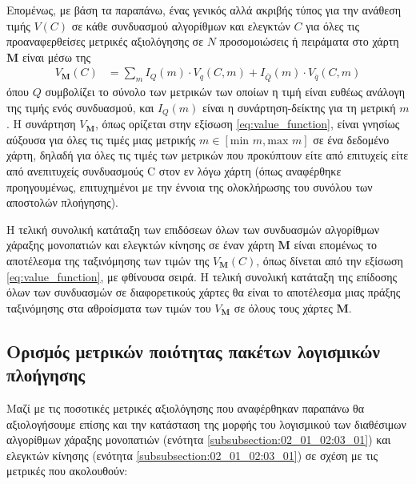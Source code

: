 Επομένως, με βάση τα παραπάνω, ένας γενικός αλλά ακριβής τύπος για την ανάθεση
τιμής $V(C)$ σε κάθε συνδυασμού αλγορίθμων και ελεγκτών $C$ για όλες τις
προαναφερθείσες μετρικές αξιολόγησης σε $N$ προσομοιώσεις ή πειράματα στο χάρτη
$\bm{M}$ είναι μέσω της
\begin{align}
  \label{eq:value_function}
  V_{\bm{M}}(C) &= \sum\limits_{m} I_Q(m) \cdot V_q(C,m) + I_{\overline{Q}}(m) \cdot V_{\overline{q}}(C,m)
\end{align}
όπου $Q$ συμβολίζει το σύνολο των μετρικών των οποίων η τιμή είναι ευθέως
ανάλογη της τιμής ενός συνδυασμού, και $I_Q(m)$ είναι η συνάρτηση-δείκτης για
τη μετρική $m$.  H συνάρτηση $V_{\bm{M}}$, όπως ορίζεται στην εξίσωση
\ref{eq:value_function}, είναι γνησίως αύξουσα για όλες τις τιμές μιας μετρικής
$m \in [\text{min } m, \text{max } m]$ σε ένα δεδομένο χάρτη, δηλαδή για όλες
τις τιμές των μετρικών που προκύπτουν είτε από επιτυχείς είτε από ανεπιτυχείς
συνδυασμούς C στον εν λόγω χάρτη (όπως αναφέρθηκε προηγουμένως, επιτυχημένοι
με την έννοια της ολοκλήρωσης του συνόλου των αποστολών πλοήγησης).

Η τελική συνολική κατάταξη των επιδόσεων όλων των συνδυασμών αλγορίθμων
χάραξης μονοπατιών και ελεγκτών κίνησης σε έναν χάρτη $\bm{M}$ είναι
επομένως το αποτέλεσμα της ταξινόμησης των τιμών της $V_{\bm{M}}(C)$, όπως
δίνεται από την εξίσωση \ref{eq:value_function}, με φθίνουσα σειρά. Η τελική
συνολική κατάταξη της επίδοσης όλων των συνδυασμών σε διαφορετικούς χάρτες θα
είναι το αποτέλεσμα μιας πράξης ταξινόμησης στα αθροίσματα των τιμών του
$V_{\bm{M}}$ σε όλους τους χάρτες $\bm{M}$.


\subsection{Ορισμός μετρικών ποιότητας πακέτων λογισμικών πλοήγησης}
\label{subsection:02_01_03:04}

Μαζί με τις ποσοτικές μετρικές αξιολόγησης που αναφέρθηκαν παραπάνω θα
αξιολογήσουμε επίσης και την κατάσταση της μορφής του λογισμικού των διαθέσιμων
αλγορίθμων χάραξης μονοπατιών (ενότητα \ref{subsubsection:02_01_02:03_01})
και ελεγκτών κίνησης (ενότητα \ref{subsubsection:02_01_02:03_01}) σε σχέση με
τις μετρικές που ακολουθούν:


